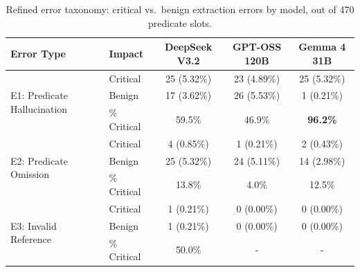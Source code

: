 \begin{table}[htbp]
\centering
\caption{Refined error taxonomy: critical vs.\ benign extraction errors by model, out of 470 predicate slots.}
\label{tab:taxonomy}
\begin{tabular}{llccc}
\toprule
\textbf{Error Type} & \textbf{Impact} & \textbf{DeepSeek V3.2} & \textbf{GPT-OSS 120B} & \textbf{Gemma 4 31B} \\
\midrule
\multirow{3}{*}{E1: Predicate Hallucination} & Critical & 25 (5.32\%) & 23 (4.89\%) & 25 (5.32\%) \\
                                              & Benign   & 17 (3.62\%) & 26 (5.53\%) & 1 (0.21\%) \\
                                              & \% Critical & 59.5\% & 46.9\% & \textbf{96.2\%} \\
\midrule
\multirow{3}{*}{E2: Predicate Omission}      & Critical & 4 (0.85\%) & 1 (0.21\%) & 2 (0.43\%) \\
                                              & Benign   & 25 (5.32\%) & 24 (5.11\%) & 14 (2.98\%) \\
                                              & \% Critical & 13.8\% & 4.0\% & 12.5\% \\
\midrule
\multirow{3}{*}{E3: Invalid Reference}       & Critical & 1 (0.21\%) & 0 (0.00\%) & 0 (0.00\%) \\
                                              & Benign   & 1 (0.21\%) & 0 (0.00\%) & 0 (0.00\%) \\
                                              & \% Critical & 50.0\% & - & - \\
\bottomrule
\end{tabular}
\end{table}

